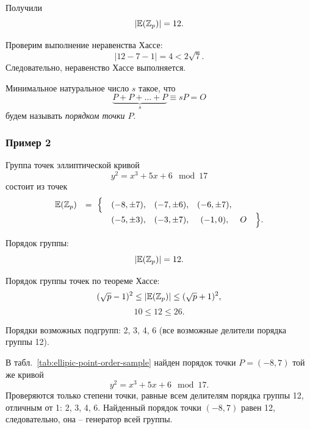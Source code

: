 Получили
    \[ |\mathbb{E}(\mathbb{Z}_p)| = 12. \]

Проверим выполнение неравенства Хассе:
    \[ \left| 12 - 7 - 1 \right| = 4 < 2 \sqrt{7}. \]
Следовательно, неравенство Хассе выполняется.

Минимальное натуральное число $s$ такое, что
\[ \underbrace{P + P + \ldots + P}_{s} \equiv s P = O \]
будем называть \emph{порядком точки $P$}.


\subsubsection{Пример 2}

Группа точек эллиптической кривой
    \[ y^2 = x^3 + 5 x + 6 \mod 17 \]
состоит из точек
\[ \begin{array}{ccccccc}
    \mathbb{E}(\mathbb{Z}_p) & =~ \Big\{ & (-8, \pm 7), & (-7, \pm 6), & (-6, \pm 7), &   & \\
             &           & (-5, \pm 3), & (-3, \pm 7), & (-1, 0),     & O & \Big\}. \\
\end{array} \]

Порядок группы:
    \[ |\mathbb{E}(\mathbb{Z}_p)| = 12. \]

Порядок группы точек по теореме Хассе:
    \[ (\sqrt{p}-1)^2 \leq |\mathbb{E}(\mathbb{Z}_p)| \leq (\sqrt{p}+1)^2, \]
    \[ 10 \leq 12 \leq 26. \]

Порядки возможных подгрупп: 2, 3, 4, 6 (все возможные делители порядка группы 12).

В табл.~\ref{tab:ellipic-point-order-sample} найден порядок точки $P = (-8, 7)$ той же кривой
    \[ y^2 = x^3 + 5 x + 6 \mod 17. \]
Проверяются только степени точки, равные всем делителям порядка группы 12, отличным от 1: 2, 3, 4, 6. Найденный порядок точки $(-8,7)$ равен 12, следовательно, она -- генератор всей группы.

